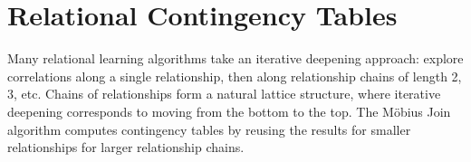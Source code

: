 \documentclass{sig-alternate-2013}
\begin{document}
\section{Relational  Contingency Tables}
Many relational learning algorithms take an iterative deepening approach: 
explore correlations along a single relationship, then along relationship chains of length 2, 3, etc. 
Chains of relationships form a natural lattice structure, where iterative deepening corresponds to moving from the bottom to the top. 
%
The M\"obius Join algorithm computes contingency tables by reusing the results for smaller relationships for larger relationship chains. 
\end{document}

